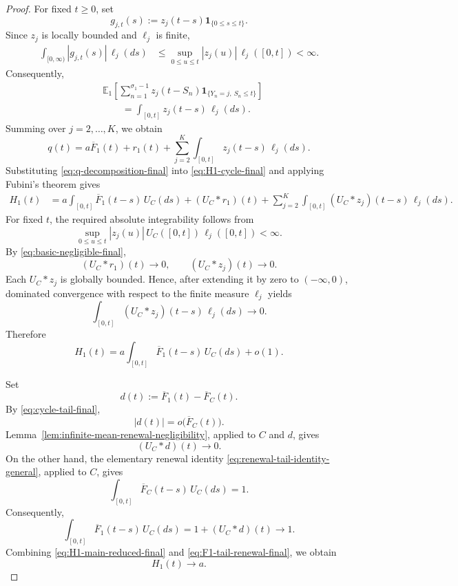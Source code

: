 \documentclass[10pt,a4paper]{amsart}
\newcommand{\E}{\mathbb E}
\newcommand{\ind}[1]{\mathbf 1_{\{#1\}}}
\begin{document}
\begin{proof}
For fixed \(t\ge0\), set
\[
  g_{j,t}(s)
  :=
  z_j(t-s)\ind{0\le s\le t}.
\]
Since \(z_j\) is locally bounded and \(\ell_j\) is finite,
\[
\begin{split}
  \int_{[0,\infty)}|g_{j,t}(s)|\,\ell_j(ds)
  &\le
  \sup_{0\le u\le t}|z_j(u)|\,
  \ell_j([0,t])
  <\infty.
\end{split}
\]
Consequently,
\[
\begin{split}
  &\E_1\left[
    \sum_{n=1}^{\sigma_1-1}
    z_j(t-S_n)\ind{Y_n=j,\ S_n\le t}
  \right]\\
  &\qquad=
  \int_{[0,t]}z_j(t-s)\,\ell_j(ds).
\end{split}
\]
Summing over \(j=2,\dots,K\), we obtain
\begin{equation}\label{eq:q-decomposition-final}
  q(t)
  =
  a\overline F_1(t)+r_1(t)
  +
  \sum_{j=2}^K
  \int_{[0,t]}z_j(t-s)\,\ell_j(ds).
\end{equation}
Substituting \eqref{eq:q-decomposition-final} into \eqref{eq:H1-cycle-final} and applying Fubini's theorem gives
\begin{equation}\label{eq:H1-conv-decomp-final}
\begin{split}
  H_1(t)
  &=
  a\int_{[0,t]}\overline F_1(t-s)\,U_C(ds)
  +(U_C*r_1)(t)+
  \sum_{j=2}^K
  \int_{[0,t]}(U_C*z_j)(t-s)\,\ell_j(ds).
\end{split}
\end{equation}
For fixed \(t\), the required absolute integrability follows from
\[
  \sup_{0\le u\le t}|z_j(u)|\,
  U_C([0,t])\,\ell_j([0,t])
  <\infty.
\]
By \eqref{eq:basic-negligible-final},
\[
  (U_C*r_1)(t)\longrightarrow0,
  \qquad
  (U_C*z_j)(t)\longrightarrow0.
\]
Each \(U_C*z_j\) is globally bounded. Hence, after extending it by zero to \((-\infty,0)\), dominated convergence with respect to the finite measure \(\ell_j\) yields
\[
  \int_{[0,t]}(U_C*z_j)(t-s)\,\ell_j(ds)
  \longrightarrow0.
\]
Therefore
\begin{equation}\label{eq:H1-main-reduced-final}
  H_1(t)
  =
  a\int_{[0,t]}\overline F_1(t-s)\,U_C(ds)+o(1).
\end{equation}

Set
\[
  d(t):=\overline F_1(t)-\overline F_C(t).
\]
By \eqref{eq:cycle-tail-final},
\[
  |d(t)|=o\bigl(\overline F_C(t)\bigr).
\]
Lemma~\ref{lem:infinite-mean-renewal-negligibility}, applied to \(C\) and \(d\), gives
\[
  (U_C*d)(t)\longrightarrow0.
\]
On the other hand, the elementary renewal identity \eqref{eq:renewal-tail-identity-general}, applied to \(C\), gives
\[
  \int_{[0,t]}\overline F_C(t-s)\,U_C(ds)=1.
\]
Consequently,
\begin{equation}\label{eq:F1-tail-renewal-final}
  \int_{[0,t]}\overline F_1(t-s)\,U_C(ds)
  =
  1+(U_C*d)(t)
  \longrightarrow1.
\end{equation}
Combining \eqref{eq:H1-main-reduced-final} and \eqref{eq:F1-tail-renewal-final}, we obtain
\[
  H_1(t)\longrightarrow a.
\]



\end{proof}
\end{document}
